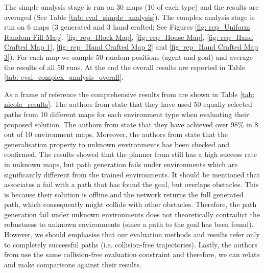 The simple analysis stage is run on 30 maps (10 of each type) and the results are averaged (See Table \ref{tab: eval_simple_analysis}). The complex analysis stage is run on 6 maps (3 generated and 3 hand crafted; See Figures \ref{fig: rep_Uniform Random Fill Map}, \ref{fig: rep_Block Map}, \ref{fig: rep_House Map}, \ref{fig: rep_Hand Crafted Map 1}, \ref{fig: rep_Hand Crafted Map 2} and \ref{fig: rep_Hand Crafted Map 3}). For each map we sample 50 random positions (agent and goal) and average the results of all 50 runs. At the end the overall results are reported in Table \ref{tab: eval_complex_analysis_overall}.

As a frame of reference the comprehensive results from \cite{nicola2018lstm} are shown in Table \ref{tab: nicola_results}. The authors from \cite{nicola2018lstm} state that they have used 50 equally selected paths from 10 different maps for each environment type when evaluating their proposed solution. The authors from \cite{inoue2019robot} state that they have achieved over 98\% in 8 out of 10 environment maps. Moreover, the authors from \cite{inoue2019robot} state that the generalisation property to unknown environments has been checked and confirmed. The results showed that the planner from \cite{inoue2019robot} still has a high success rate in unknown maps, but path generation fails under environments which are significantly different from the trained environments. It should be mentioned that \cite{inoue2019robot} associates a fail with a path that has found the goal, but overlaps obstacles. This is because their solution is offline and the network returns the full generated path, which consequently might collide with other obstacles. Therefore, the path generation fail under unknown environments does not theoretically contradict the robustness to unknown environments (since a path to the goal has been found). However, we should emphasise that our evaluation methods and results refer only to completely successful paths (i.e. collision-free trajectories). Lastly, the authors from \cite{nicola2018lstm} use the same collision-free evaluation constraint and therefore, we can relate and make comparisons against their results.

